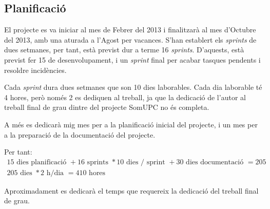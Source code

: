 \subsection{Planificació}

El projecte es va iniciar al mes de Febrer del 2013 i finalitzarà al mes d'Octubre del 2013, amb una aturada a l'Agost per vacances. S'han establert els \textit{sprints} de dues setmanes, per tant, està previst dur a terme 16 \textit{sprints}. D'aquests, està previst fer 15 de desenvolupament, i un \textit{sprint} final per acabar tasques pendents i resoldre incidències.

Cada \textit{sprint} dura dues setmanes que son 10 dies laborables. Cada dia laborable té 4 hores, però només 2 es dediquen al treball, ja que la dedicació de l'autor al treball final de grau dintre del projecte SomUPC no és completa.

A més es dedicarà mig mes per a la planificació inicial del projecte, i un mes per a la preparació de la documentació del projecte. 

Per tant:
\begin{eqnarray} 
15 \mbox{ dies planificació } + 16 \mbox{ sprints } * 10 \mbox{ dies }/\mbox{ sprint } + 30 \mbox{ dies documentació } = 205 \nonumber \\
205 \mbox{ dies } * 2 \mbox{ h}/\mbox{dia } = 410 \mbox{ hores}
\end{eqnarray}

Aproximadament es dedicarà el temps que requereix la dedicació del treball final de grau.









